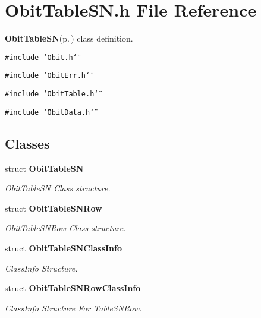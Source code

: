 \section{Obit\-Table\-SN.h File Reference}
\label{ObitTableSN_8h}
{\bf Obit\-Table\-SN}{\rm (p.\,\pageref{structObitTableSN})} class definition. 

{\tt \#include \char`\"{}Obit.h\char`\"{}}\par
{\tt \#include \char`\"{}Obit\-Err.h\char`\"{}}\par
{\tt \#include \char`\"{}Obit\-Table.h\char`\"{}}\par
{\tt \#include \char`\"{}Obit\-Data.h\char`\"{}}\par
\subsection*{Classes}
\begin{CompactItemize}
\item 
struct {\bf Obit\-Table\-SN}
\begin{CompactList}\small\item\em Obit\-Table\-SN Class structure. \item\end{CompactList}\item 
struct {\bf Obit\-Table\-SNRow}
\begin{CompactList}\small\item\em Obit\-Table\-SNRow Class structure. \item\end{CompactList}\item 
struct {\bf Obit\-Table\-SNClass\-Info}
\begin{CompactList}\small\item\em Class\-Info Structure. \item\end{CompactList}\item 
struct {\bf Obit\-Table\-SNRow\-Class\-Info}
\begin{CompactList}\small\item\em Class\-Info Structure For Table\-SNRow. \item\end{CompactList}\end{CompactItemize}
